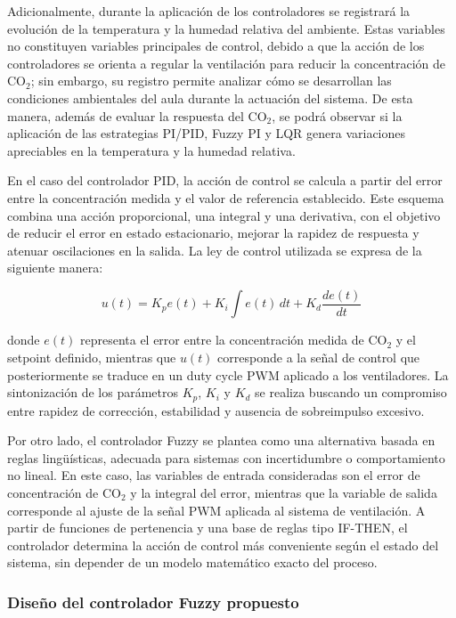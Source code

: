 Adicionalmente, durante la aplicación de los controladores se registrará la evolución de la temperatura y la humedad relativa del ambiente. Estas variables no constituyen variables principales de control, debido a que la acción de los controladores se orienta a regular la ventilación para reducir la concentración de CO$_2$; sin embargo, su registro permite analizar cómo se desarrollan las condiciones ambientales del aula durante la actuación del sistema. De esta manera, además de evaluar la respuesta del CO$_2$, se podrá observar si la aplicación de las estrategias PI/PID, Fuzzy PI y LQR genera variaciones apreciables en la temperatura y la humedad relativa.

En el caso del controlador PID, la acción de control se calcula a partir del error entre la concentración medida y el valor de referencia establecido. Este esquema combina una acción proporcional, una integral y una derivativa, con el objetivo de reducir el error en estado estacionario, mejorar la rapidez de respuesta y atenuar oscilaciones en la salida. La ley de control utilizada se expresa de la siguiente manera:

\begin{equation}
    u(t) = K_p e(t) + K_i \int e(t)\,dt + K_d \frac{de(t)}{dt}
\end{equation}

donde \(e(t)\) representa el error entre la concentración medida de CO$_2$ y el setpoint definido, mientras que \(u(t)\) corresponde a la señal de control que posteriormente se traduce en un duty cycle PWM aplicado a los ventiladores. La sintonización de los parámetros \(K_p\), \(K_i\) y \(K_d\) se realiza buscando un compromiso entre rapidez de corrección, estabilidad y ausencia de sobreimpulso excesivo.

Por otro lado, el controlador Fuzzy se plantea como una alternativa basada en reglas lingüísticas, adecuada para sistemas con incertidumbre o comportamiento no lineal. En este caso, las variables de entrada consideradas son el error de concentración de CO$_2$ y la integral del error, mientras que la variable de salida corresponde al ajuste de la señal PWM aplicada al sistema de ventilación. A partir de funciones de pertenencia y una base de reglas tipo IF-THEN, el controlador determina la acción de control más conveniente según el estado del sistema, sin depender de un modelo matemático exacto del proceso.


\subsubsection{Diseño del controlador Fuzzy propuesto}

